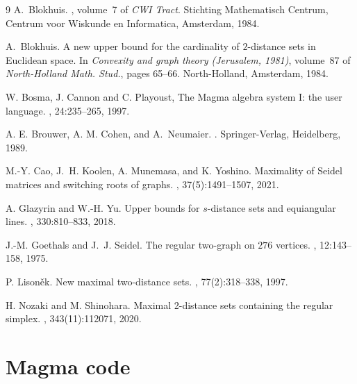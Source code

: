 \documentclass[12pt]{article}
\theoremstyle{definition}
\begin{document}
\begin{thebibliography}{9}
A.~Blokhuis.
, volume~7 of {\em CWI Tract}.
\newblock Stichting Mathematisch Centrum, Centrum voor Wiskunde en Informatica,
  Amsterdam, 1984.

A.~Blokhuis.
\newblock A new upper bound for the cardinality of {$2$}-distance sets in
  {E}uclidean space.
\newblock In {\em Convexity and graph theory ({J}erusalem, 1981)}, volume~87 of
  {\em North-Holland Math. Stud.}, pages 65--66. North-Holland, Amsterdam,
  1984.

W. Bosma, J. Cannon and C. Playoust,
\newblock The Magma algebra system I: the user language. 
, 24:235--265, 1997.

A. E. Brouwer, A. M. Cohen, and A.~Neumaier.
.
\newblock Springer-Verlag, Heidelberg, 1989.

M.-Y. Cao, J.~H. Koolen, A. Munemasa, and K. Yoshino.
\newblock Maximality of {S}eidel matrices and switching roots of graphs.
, 37(5):1491--1507, 2021.

A. Glazyrin and W.-H. Yu.
\newblock Upper bounds for {$s$}-distance sets and equiangular lines.
, 330:810--833, 2018.

J.-M. Goethals and J.~J. Seidel.
\newblock The regular two-graph on {$276$} vertices.
, 12:143--158, 1975.

P. Lison\v{e}k.
\newblock New maximal two-distance sets.
, 77(2):318--338, 1997.

H. Nozaki and M. Shinohara.
\newblock Maximal 2-distance sets containing the regular simplex.
, 343(11):112071, 2020.

\end{thebibliography}

\appendix
\section{Magma code}
\end{document}
